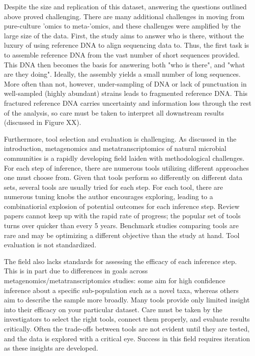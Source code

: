 Despite the size and replication of this dataset, answering the questions outlined above proved challenging.
There are many additional challenges in moving from pure-culture 'omics to meta-'omics, and these challenges were amplified by the large size of the data.
First, the study aims to answer who is there, without the luxury of using reference DNA to align sequencing data to.
Thus, the first task is to assemble reference DNA from the vast number of short sequences provided.
This DNA then becomes the basis for answering both "who is there", and "what are they doing".
Ideally, the assembly yields a small number of long sequences.
More often than not, however, under-sampling of DNA or lack of punctuation in well-sampled (highly abundant) strains leads to fragmented reference DNA.
This fractured reference DNA carries uncertainty and information loss through the rest of the analysis, so care must be taken to interpret all downstream results (discussed in Figure XX).

Furthermore, tool selection and evaluation is challenging.
As discussed in the introduction, metagenomics and metatranscriptomics of natural microbial communities is a rapidly developing field laiden with methodological challenges.
For each step of inference, there are numerous tools utilizing different approaches one must choose from.
Given that tools perform so differently on different data sets, several tools are usually tried for each step.
For each tool, there are numerous tuning knobs the author encourages exploring, leading to a combinatiorial explosion of potential outcomes for each inference step.
Review papers cannot keep up with the rapid rate of progress; the popular set of tools turns over quicker than every 5 years.
Benchmark studies comparing tools are rare and may be optimizing a different objective than the study at hand.
Tool evaluation is not standardized.

The field also lacks standards for assessing the efficacy of each inference step.
This is in part due to differences in goals across metagenomics/metatranscriptomics studies: some aim for high confidence inference about a specific sub-population such as a novel taxa, whereas others aim to describe the sample more broadly.
Many tools provide only limited insight into their efficacy on your particular dataset.
Care must be taken by the investigators to select the right tools, connect them properly, and evaluate results critically.
Often the trade-offs between tools are not evident until they are tested, and the data is explored with a critical eye.
Success in this field requires iteration as these insights are developed.

